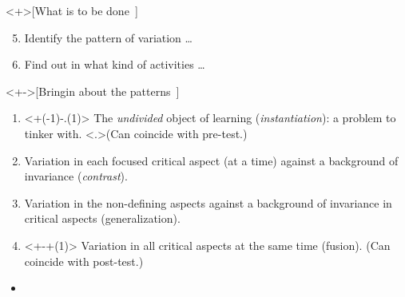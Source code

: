 \begin{frame}
  \begin{example}<+>[What is to be 
    done~{\cite[p.~257]{NecessaryConditionsOfLearning}}]
    \begin{enumerate}\setcounter{enumi}{4}
      \item Identify the pattern of variation \dots
      \item Find out in what kind of activities \dots
    \end{enumerate}
  \end{example}

  \begin{example}<+->[Bringin about the 
    patterns~{\cite[p.~263]{NecessaryConditionsOfLearning}}]
    \begin{enumerate}
      \item<+(-1)-.(1)> The \emph{undivided} object of learning 
        (\emph{instantiation}): a problem to tinker with.
        \alert<.>{(Can coincide with pre-test.)}

      \item<+> Variation in each focused critical aspect (at a time) against a 
        background of invariance (\emph{contrast}).

      \item<+> Variation in the non-defining aspects against a background of 
        invariance in critical aspects (generalization).

      \item<+-+(1)> Variation in all critical aspects at the same time 
        (fusion).
        \alert<+>{(Can coincide with post-test.)}
    \end{enumerate}
  \end{example}
\end{frame}

\begin{frame}
  \begin{remark}
    \begin{itemize}
      \item {}
    \end{itemize}
  \end{remark}
\end{frame}

